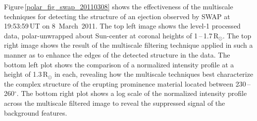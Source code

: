 \documentclass[namedreferences]{solarphysics}
\begin{document}
\begin{article}
Figure\,\ref{polar_fig_swap_20110308} shows the effectiveness of the multiscale techniques for detecting the structure of an ejection observed by SWAP at 19:53:59\,UT on 8~March~2011. The top left image shows the level-1 processed data, polar-unwrapped about Sun-center at coronal heights of 1\,--\,1.7\,R$_{\odot}$. The top right image shows the result of the multiscale filtering technique applied in such a manner as to enhance the edges of the detected structure in the data. The bottom left plot shows the comparison of a normalized intensity profile at a height of 1.3\,R$_{\odot}$ in each, revealing how the multiscale techniques best characterize the complex structure of the erupting prominence material located between  230\,--\,260$^\circ$. The bottom right plot shows a log scale of the normalized intensity profile across the multiscale filtered image to reveal the suppressed signal of the background features.
\begin{figure}[p]

\end{figure}
\end{article}
\end{document}
